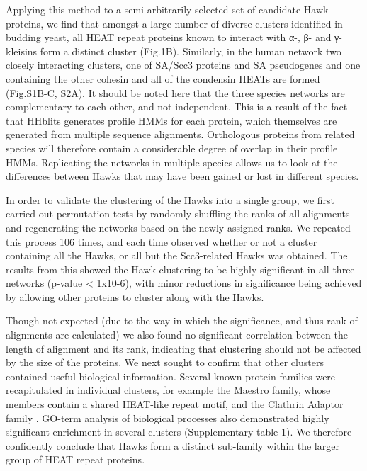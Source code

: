 \documentclass[a4paper,11pt,twoside,openright]{scrbook}
\let\cite\supercite
\begin{document}
Applying this method to a semi-arbitrarily selected set of candidate Hawk proteins, we find that amongst a large number of diverse clusters identified in budding yeast, all HEAT repeat proteins known to interact with α-, β- and γ- kleisins \cite{Nasmyth2009, Hirano2016} form a distinct cluster  (Fig.1B). Similarly, in the human network two closely interacting clusters, one of SA/Scc3 proteins and SA pseudogenes and one containing the other cohesin and all of the condensin HEATs are formed (Fig.S1B-C, S2A). It should be noted here that the three species networks are complementary to each other, and not independent. This is a result of the fact that HHblits generates profile HMMs for each protein, which themselves are generated from multiple sequence alignments. Orthologous proteins from related species will therefore contain a considerable degree of overlap in their profile HMMs. Replicating the networks in multiple species allows us to look at the differences between Hawks that may have been gained or lost in different species.

In order to validate the clustering of the Hawks into a single group, we first carried out permutation tests by randomly shuffling the ranks of all alignments and regenerating the networks based on the newly assigned ranks. We repeated this process 106 times, and each time observed whether or not a cluster containing all the Hawks, or all but the Scc3-related Hawks was obtained. The results from this showed the Hawk clustering to be highly significant in all three networks (p-value < 1x10-6), with minor reductions in significance being achieved by allowing other proteins to cluster along with the Hawks.

Though not expected (due to the way in which the significance, and thus rank of alignments are calculated) we also found no significant correlation between the length of alignment and its rank, indicating that clustering should not be affected by the size of the proteins. We next sought to confirm that other clusters contained useful biological information. Several known protein families were recapitulated in individual clusters, for example the Maestro family, whose members contain a shared HEAT-like repeat motif, and the Clathrin Adaptor family \cite{Smith2003a, McMahon2004}. GO-term analysis of biological processes also demonstrated highly significant enrichment in several clusters (Supplementary table 1). We therefore confidently conclude that Hawks form a distinct sub-family within the larger group of HEAT repeat proteins.
\end{document}
